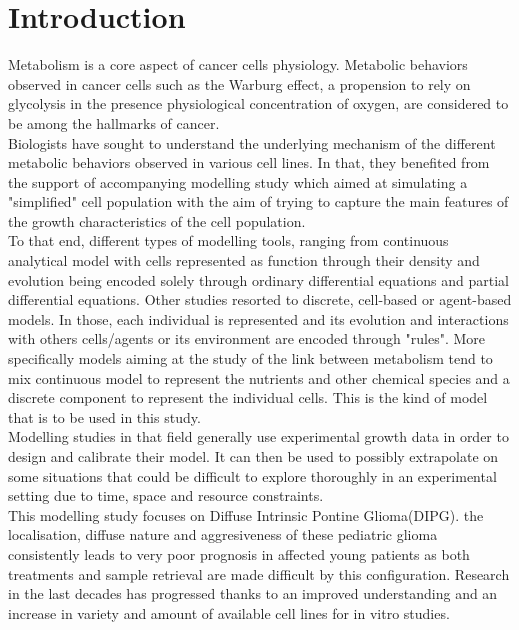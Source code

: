 \documentclass[11pt,a4paper]{article}
\begin{document}
\tableofcontents

\newpage
\section{Introduction}
Metabolism  is a core aspect of cancer cells physiology. Metabolic behaviors observed in cancer cells such as the Warburg effect, a propension to rely on glycolysis in the presence physiological concentration of oxygen, are considered to be among the hallmarks of cancer.\cite{Lunt2011}\\

Biologists have sought to understand the underlying mechanism of the different metabolic behaviors observed in various cell lines. In that, they benefited from the support of accompanying modelling study which aimed at simulating a "simplified" cell population with the aim of trying to capture the main features of the growth characteristics of the cell population.\\ 

To that end, different types of modelling tools, ranging from continuous analytical model with cells represented as function through their density and evolution being encoded solely through ordinary differential equations and partial differential equations. Other studies resorted to discrete, cell-based or agent-based models. In those, each individual is represented and its evolution and interactions with others cells/agents or its environment are encoded through "rules". More specifically models aiming at the study of the link between metabolism tend to mix continuous model to represent the nutrients and other chemical species and a discrete component to represent the individual cells. This is the kind of model that is to be used in this study. \\

Modelling studies in that field generally use experimental growth data in order to design and calibrate their model. It can then be used to possibly extrapolate on some situations that could be difficult to explore thoroughly in an  experimental setting due to time, space and resource constraints.\\

This modelling study focuses on Diffuse Intrinsic Pontine Glioma(DIPG). the localisation, diffuse nature and aggresiveness of these pediatric glioma consistently leads to very poor prognosis in affected young patients as both treatments and sample retrieval are made difficult by this configuration. Research in the last decades has progressed thanks to an improved understanding and an increase in variety and amount of available cell lines for in vitro studies.\\
\end{document}
